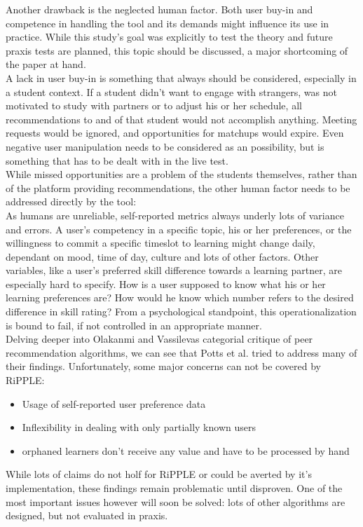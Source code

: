 \documentclass[nochapterpage,bigchapter,linedtoc,longdoc,colorback,accentcolor=tud3b,oneside]{tudreport}
\begin{document}
Another drawback is the neglected human factor. Both user buy-in and competence in handling the tool and its demands might influence its use in practice. While this study's goal was explicitly to test the theory and future praxis tests are planned, this topic should be discussed, a major shortcoming of the paper at hand.\\
A lack in user buy-in is something that always should be considered, especially in a student context. If a student didn't want to engage with strangers, was not motivated to study with partners or to adjust his or her schedule, all recommendations to and of that student would not accomplish anything. Meeting requests would be ignored, and opportunities for matchups would expire. Even negative user manipulation needs to be considered as an possibility, but is something that has to be dealt with in the live test.\\
While missed opportunities are a problem of the students themselves, rather than of the platform providing recommendations, the other human factor needs to be addressed directly by the tool:\\
As humans are unreliable, self-reported metrics always underly lots of variance and errors. A user's competency in a specific topic, his or her preferences, or the willingness to commit a specific timeslot to learning might change daily, dependant on mood, time of day, culture and lots of other factors. \cite{lee2002cultural} \cite{sorensen2008measuring} Other variables, like a user's preferred skill difference towards a learning partner, are especially hard to specify. How is a user supposed to know what his or her learning preferences are? How would he know which number refers to the desired difference in skill rating? From a psychological standpoint, this operationalization is bound to fail, if not controlled in an appropriate manner. \cite{gonyea2005self}\\

Delving deeper into Olakanmi and Vassilevas categorial critique of peer recommendation algorithms, we can see that Potts et al. tried to address many of their findings. \cite{olakanmi2017group} Unfortunately, some major concerns can not be covered by RiPPLE:
\begin{itemize}
	\item Usage of self-reported user preference data
	\item Inflexibility in dealing with only partially known users
	\item orphaned learners don't receive any value and have to be processed by hand
\end{itemize}
While lots of claims do not holf for RiPPLE or could be averted by it's implementation, these findings remain problematic until disproven. One of the most important issues however will soon be solved: lots of other algorithms are designed, but not evaluated in praxis.\\
\end{document}
